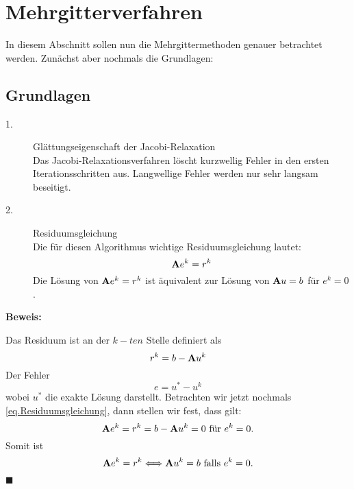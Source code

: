 \chapter{Mehrgitterverfahren}\label{c.Mehrgitterverfahren}

In diesem Abschnitt sollen nun die Mehrgittermethoden genauer betrachtet werden. Zunächst aber nochmals die Grundlagen:

\section{Grundlagen}\label{s.Idee MGM}

\begin{description}

\item[1.] Glättungseigenschaft der Jacobi-Relaxation \\
Das Jacobi-Relaxationsverfahren löscht kurzwellig Fehler in den ersten Iterationsschritten aus. Langwellige Fehler werden nur sehr langsam beseitigt.
\item[2.] Residuumsgleichung \\
Die für diesen Algorithmus wichtige Residuumsgleichung lautet:
\begin{equation}
{\textbf{A}} e^{k} = r^{k}\label{eq.Residuumsgleichung}
\end{equation}
Die Lösung von ${\textbf{A}} e^{k} = r^{k}$ ist äquivalent zur Lösung von ${\textbf{A}}u=b$ für $e^{k} = 0$.

\end{description}

\textbf{Beweis:}

Das Residuum ist an der $k-ten$ Stelle definiert als 
\begin{equation}
r^{k} = b - {\textbf{A}}u^{k}
\end{equation}
Der Fehler
\begin{equation}
e = u^{*} - u^{k}\label{eq.Fehler}
\end{equation}
wobei $u^{*}$ die exakte Lösung darstellt.
Betrachten wir jetzt nochmals \autoref{eq.Residuumsgleichung}, dann stellen wir fest, dass gilt:
\begin{equation}
{\textbf{A}}e^{k} = r^{k} = b - {\textbf{A}}u^{k} = 0 \textnormal{ für } e^{k} = 0.
\end{equation}
Somit ist
\begin{equation}
{\textbf{A}}e^{k} = r^{k} \Longleftrightarrow {\textbf{A}}u^{k} = b \textnormal{ falls } e^{k} = 0.
\end{equation}
\begin{flushright}
$\blacksquare$
\end{flushright}

